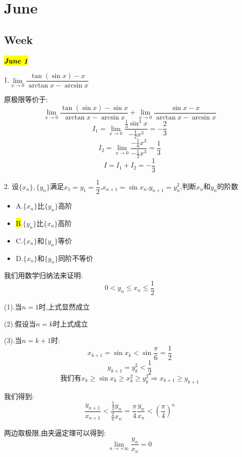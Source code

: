 \chapter{June}
\section{Week }
\hl{\textbf{\textit{June 1}}}

1.$\lim\limits_{x\rightarrow 0}\dfrac{\tan(\sin x)-x}{\arctan x-\arcsin x}$
\begin{solution}
	
	原极限等价于: 
	$$\lim\limits_{x\rightarrow 0}\dfrac{\tan(\sin x)-\sin x}{\arctan x-\arcsin x}+\lim\limits_{x\rightarrow 0}\dfrac{\sin x-x}{\arctan x-\arcsin x}$$
	$$I_{1}=\lim\limits_{x\rightarrow 0}\dfrac{\frac{1}{3}\sin^3 x}{-\frac{1}{2}x^3}=-\frac{2}{3}$$
	$$I_{2}=\lim\limits_{x\rightarrow 0}\dfrac{-\frac{1}{6} x^3}{-\frac{1}{2}x^3}=\frac{1}{3}$$
	$$I=I_{1}+I_{2}=-\frac{1}{3}$$
\end{solution}

2. 设$\{x_{n}\},\{y_{n}\}$满足$x_{1}=y_{1}=\dfrac{1}{2}$,$x_{n+1}=\sin x_{n}$,$y_{n+1}=y_{n}^2$,判断$x_{n}$和$y_{n}$的阶数
\begin{itemize}
	\item A.$\{x_{n}\}\text{比}\{y_{n}\}\text{高阶}$
	\item \hl{B}.$\{y_{n}\}\text{比}\{x_{n}\}\text{高阶}$
	\item C.$\{x_{n}\}\text{和}\{y_{n}\}\text{等价}$
	\item D.$\{x_{n}\}\text{和}\{y_{n}\}\text{同阶不等价}$
\end{itemize}
\begin{solution}
	
	我们用数学归纳法来证明: 
	$$0<y_{n}\leq x_{n}\leq \frac{1}{2}$$
	
	(1).当$n=1$时,上式显然成立
	
	(2).假设当$n=k$时上式成立
	
	(3).当$n=k+1$时: 
	$$x_{k+1}=\sin x_{k}<\sin \frac{\pi}{6}=\frac{1}{2}$$
	$$y_{k+1}=y_{k}^2<\frac{1}{2}$$
	$$\text{我们有}x_{k}\geq \sin x_{k}\geq x_{k}^2\geq y_{k}^2\Rightarrow x_{k+1}\geq y_{k+1}$$
	
	我们得到: 
	$$\dfrac{y_{n+1}}{x_{n+1}}<\dfrac{\frac{1}{2}y_{n}}{\frac{2}{\pi}x_{n}}=\dfrac{\pi}{4}\dfrac{y_{n}}{x_{n}}<(\dfrac{\pi}{4})^n$$
	
	两边取极限,由夹逼定理可以得到: 
	$$\lim\limits_{n\rightarrow +\infty}\frac{y_{n}}{x_{n}}=0$$
\end{solution}

